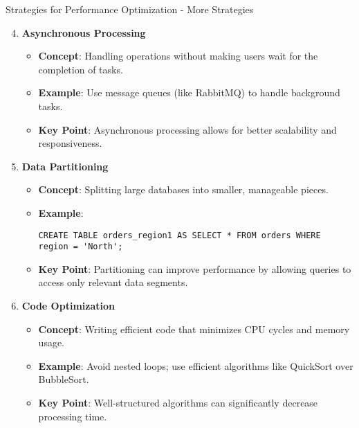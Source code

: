 \documentclass[aspectratio=169]{beamer}
\begin{document}
\begin{frame}[fragile]{Strategies for Performance Optimization - More Strategies}
    \begin{enumerate}
        \setcounter{enumi}{3} %
        \item \textbf{Asynchronous Processing}
            \begin{itemize}
                \item \textbf{Concept}: Handling operations without making users wait for the completion of tasks.
                \item \textbf{Example}: Use message queues (like RabbitMQ) to handle background tasks.
                \item \textbf{Key Point}: Asynchronous processing allows for better scalability and responsiveness.
            \end{itemize}
        
        \item \textbf{Data Partitioning}
            \begin{itemize}
                \item \textbf{Concept}: Splitting large databases into smaller, manageable pieces.
                \item \textbf{Example}:
                \begin{lstlisting}
CREATE TABLE orders_region1 AS SELECT * FROM orders WHERE region = 'North';
                \end{lstlisting}
                \item \textbf{Key Point}: Partitioning can improve performance by allowing queries to access only relevant data segments.
            \end{itemize}
        
        \item \textbf{Code Optimization}
            \begin{itemize}
                \item \textbf{Concept}: Writing efficient code that minimizes CPU cycles and memory usage.
                \item \textbf{Example}: Avoid nested loops; use efficient algorithms like QuickSort over BubbleSort.
                \item \textbf{Key Point}: Well-structured algorithms can significantly decrease processing time.
            \end{itemize}
    \end{enumerate}
\end{frame}
\end{document}
